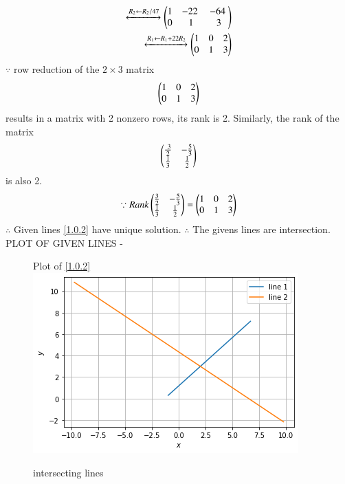 \documentclass[journal,12pt,twocolumn]{IEEEtran}
\begin{document}
\begin{enumerate}
\begin{align}
\\
\xleftrightarrow {R_2\leftarrow R_2/47}\myvec{1 & -22 & -64 \\0 & 1 & 3}
\\
\xleftrightarrow {R_1 \leftarrow R_1+22R_2}\myvec {1 & 0 & 2\\0 & 1 & 3}
\end{align}
%
$\because$ row reduction of the $2\times 3$ matrix
%
\begin{align}
\begin{pmatrix}1 & 0 & 2\\0 & 1 & 3\end{pmatrix}
\end{align}
%
results in a matrix with 2 nonzero rows, its rank is 2. 
%
Similarly, the rank of the matrix 
\begin{align}
\myvec{\frac { 3}{2}& -\frac{5}{3} \\\frac{1}{3} & \frac{1}{2} } 
\end{align}
%
is also 2.
%
\begin{align}
\because Rank \begin{pmatrix}\frac{3}{2} & -\frac {5}{3}\\\frac{1}{3} & \frac{1}{2}\end{pmatrix} &=\begin{pmatrix}1 & 0 & 2\\0 & 1 & 3\end{pmatrix}\nonumber\\
\end{align}
$\therefore$ Given lines \eqref{1.0.2} have unique solution.
$\therefore$ The givens lines are intersection. 
PLOT OF GIVEN LINES -
\begin{figure}[!ht]
Plot of \eqref{1.0.2} 
    \centering
   \includegraphics[width=\columnwidth]{figure2(2).png}
    \caption{intersecting lines}
    \label{fig: intersecting lines.}
\end{figure}    
\end{enumerate}
\end{document}
